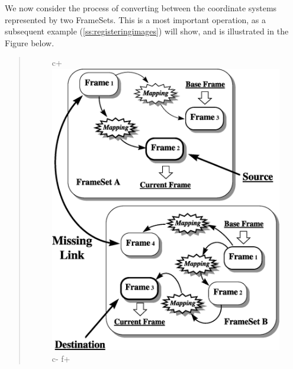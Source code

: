 \documentclass[twoside,11pt]{article}
\newcommand{\secref}[1]{\S\ref{#1}}
\renewcommand{\secref}[1]{\ref{#1}}
\begin{document}
\begin{htmlonly}
   We now consider the process of converting between the coordinate
   systems represented by two FrameSets. This is a most important
   operation, as a subsequent example (\secref{ss:registeringimages})
   will show, and is illustrated in the Figure below.
   \begin{quote}
   \begin{figure}
   \label{fig:fsconvert}
c+
   \includegraphics[scale=1.0]{sun211_figures/fsalign.eps}
c-
f+

\end{figure}
\end{quote}
\end{htmlonly}
\end{document}
